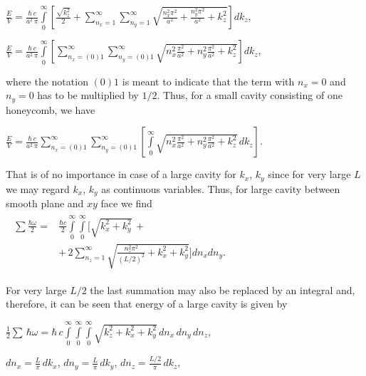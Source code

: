\documentclass[twoside, 10pt]{article}
\begin{document}
\begin{multicols}{2}
\noindent
\(\frac{E}{V} = \frac{\hbar\,c}{a^2\,\pi}\int\limits_{0}^{\infty}\left[{\frac{\sqrt{k_z^2}}{2}+\sum\limits_{n_x=1}^{\infty}\sum\limits_{n_y=1}^{\infty}\sqrt{\frac{n_x^2 \pi^2}{a^2}+\frac{n_y^2 \pi^2}{a^2}+k_z^2}}\right] dk_z\),

\noindent
\(\frac{E}{V} = \frac{\hbar\,c}{a^2\,\pi}\int\limits_{0}^{\infty}\left[{\sum\limits_{n_x=(0)1}^{\infty}\sum\limits_{n_y=(0)1}^{\infty}\sqrt{n_x^2\frac{\pi^2}{a^2}+n_y^2\frac{\pi^2}{a^2}+k_z^2}}\right] dk_z\),

    where the notation \(\left(0\right) 1\) is meant to indicate that the
term with \(n_x = 0\) and \(n_y = 0\) has to be multiplied by
\(1\big/2\). Thus, for a small cavity consisting of one honeycomb, we have

    \(\frac{E}{V} = \frac{\hbar\,c}{a^2\,\pi}\sum\limits_{n_x=(0)1}^{\infty}\sum\limits_{n_y=(0)1}^{\infty}\left[\int\limits_{0}^{\infty}\sqrt{n_x^2\frac{\pi^2}{a^2}+n_y^2\frac{\pi^2}{a^2}+k_z^2}\,dk_z\right]\).

    That is of no importance in case of a large cavity for \(k_x\), \(k_y\)
since for very large \(L\) we may regard \(k_x\), \(k_y\) as
continuous variables. Thus, for large cavity between smooth plane and \(xy\) face we find
\noindent
\(\begin{array}{c}
\begin{array}{ll}
    \sum\frac{\hbar\omega}{2} = & \frac{\hbar c}{2}\int\limits_{0}^{\infty}\int\limits_{0}^{\infty}\Bigg[\sqrt{k_x^2+k_y^2}\,+ \\
   & +\,2\sum\limits_{n_z=1}^{\infty}\sqrt{\frac{n_z^2 \pi^2}{(L/2)^2}+k_x^2+k_y^2}\Bigg]d{n_x}d{n_y}.
\end{array}
\end{array}\)


    For very large \(L/2\) the last summation may also be replaced by an
integral and, therefore, it can be seen that energy of a large cavity is given by

    \(\frac{1}{2}\sum\,\hbar\omega = \hbar\,c\int\limits_{0}^{\infty}\int\limits_{0}^{\infty}\int\limits_{0}^{\infty}\sqrt{k_z^2+k_x^2+k_y^2}\,d{n_x}\,d{n_y}\,d{n_z}\),

    \(dn_x = \frac{L}{\pi}\,dk_x\), \(dn_y = \frac{L}{\pi}\,dk_y\),
\(dn_z = \frac{L/2}{\pi}\,dk_z\),


\end{multicols}
\end{document}
